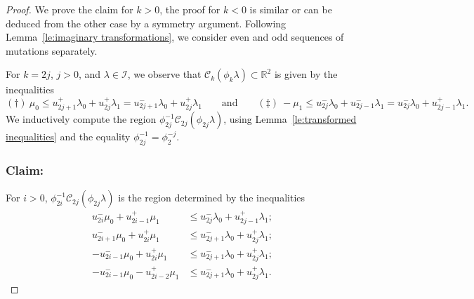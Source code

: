 \documentclass{amsart}
\numberwithin{theorem}{section}
\newcommand{\cC}{\mathcal{C}}
\newcommand{\cI}{\mathcal{I}}
\newcommand{\RR}{\mathbb{R}}
\begin{document}
  \begin{proof}
    We prove the claim for $k>0$, the proof for $k<0$ is similar or can be deduced from the other case by a symmetry argument.
    Following Lemma~\ref{le:imaginary transformations}, we consider even and odd sequences of mutations separately.

    For $k=2j$, $j>0$, and $\lambda\in\cI$, we observe that $\cC_k(\phi_k\lambda)\subset\RR^2$ is given by the inequalities 
    \[ (\dagger)\ \mu_0 \le u_{2j+1}^+\lambda_0+u_{2j}^+\lambda_1 = u_{2j+1}^-\lambda_0+u_{2j}^+\lambda_1 \qquad\text{and}\qquad (\ddagger)\ -\mu_1\le u_{2j}^-\lambda_0+u_{2j-1}^-\lambda_1 = u_{2j}^-\lambda_0+u_{2j-1}^+\lambda_1. \]
    We inductively compute the region $\phi_{2j}^{-1}\cC_{2j}(\phi_{2j}\lambda)$, using Lemma~\ref{le:transformed inequalities} and the equality $\phi_{2j}^{-1}=\phi_2^{-j}$.

    \subsubsection*{Claim:} For $i>0$, $\phi_{2i}^{-1}\cC_{2j}(\phi_{2j}\lambda)$ is the region determined by the inequalities 
    \begin{align*}
      \tag{a} u_{2i}^-\mu_0+u_{2i-1}^+\mu_1 &\le u_{2j}^-\lambda_0+u_{2j-1}^+\lambda_1;\\
      \tag{b} u_{2i+1}^-\mu_0+u_{2i}^+\mu_1 &\le u_{2j+1}^-\lambda_0+u_{2j}^+\lambda_1;\\
      \tag{c} -u_{2i-1}^-\mu_0+u_{2i}^+\mu_1 &\le u_{2j+1}^-\lambda_0+u_{2j}^+\lambda_1;\\
      \tag{d} -u_{2i-1}^-\mu_0-u_{2i-2}^+\mu_1 &\le u_{2j+1}^-\lambda_0+u_{2j}^+\lambda_1.
    \end{align*}


\end{proof}
\end{document}
